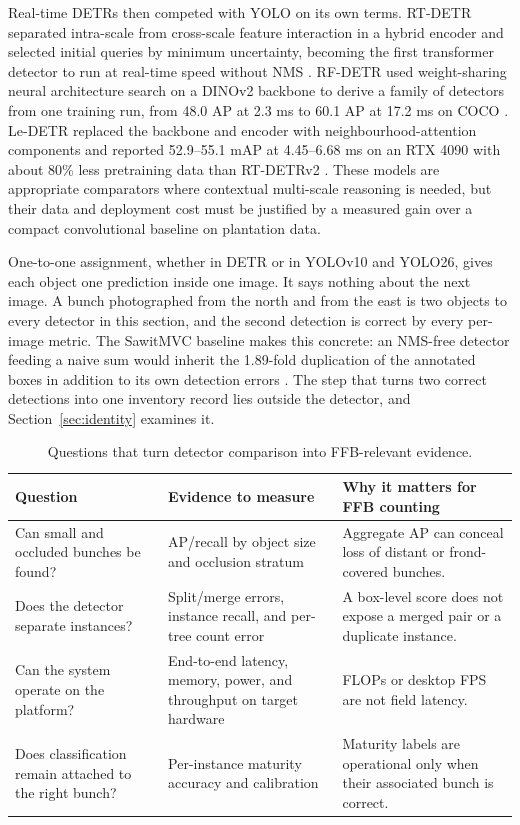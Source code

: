 Real-time DETRs then competed with YOLO on its own terms. RT-DETR separated intra-scale from cross-scale feature interaction in a hybrid encoder and selected initial queries by minimum uncertainty, becoming the first transformer detector to run at real-time speed without NMS \cite{zhao2024rtdetr}. RF-DETR used weight-sharing neural architecture search on a DINOv2 backbone to derive a family of detectors from one training run, from 48.0 AP at 2.3 ms to 60.1 AP at 17.2 ms on COCO \cite{robinson2025rfdetr}. Le-DETR replaced the backbone and encoder with neighbourhood-attention components and reported 52.9--55.1 mAP at 4.45--6.68 ms on an RTX 4090 with about 80\% less pretraining data than RT-DETRv2 \cite{huang2026ledetr}. These models are appropriate comparators where contextual multi-scale reasoning is needed, but their data and deployment cost must be justified by a measured gain over a compact convolutional baseline on plantation data.

One-to-one assignment, whether in DETR or in YOLOv10 and YOLO26, gives each object one prediction inside one image. It says nothing about the next image. A bunch photographed from the north and from the east is two objects to every detector in this section, and the second detection is correct by every per-image metric. The SawitMVC baseline makes this concrete: an NMS-free detector feeding a naive sum would inherit the 1.89-fold duplication of the annotated boxes in addition to its own detection errors \cite{indriani2026sawitmvc}. The step that turns two correct detections into one inventory record lies outside the detector, and Section~\ref{sec:identity} examines it.

\begin{table}[t]
\centering\small
\caption{Questions that turn detector comparison into FFB-relevant evidence.}
\label{tab:baseline}
\begin{tabular}{p{}p{}p{}}
\toprule
Question & Evidence to measure & Why it matters for FFB counting \\
\midrule
Can small and occluded bunches be found? & AP/recall by object size and occlusion stratum & Aggregate AP can conceal loss of distant or frond-covered bunches. \\
Does the detector separate instances? & Split/merge errors, instance recall, and per-tree count error & A box-level score does not expose a merged pair or a duplicate instance. \\
Can the system operate on the platform? & End-to-end latency, memory, power, and throughput on target hardware & FLOPs or desktop FPS are not field latency. \\
Does classification remain attached to the right bunch? & Per-instance maturity accuracy and calibration & Maturity labels are operational only when their associated bunch is correct. \\
\bottomrule
\end{tabular}
\end{table}


